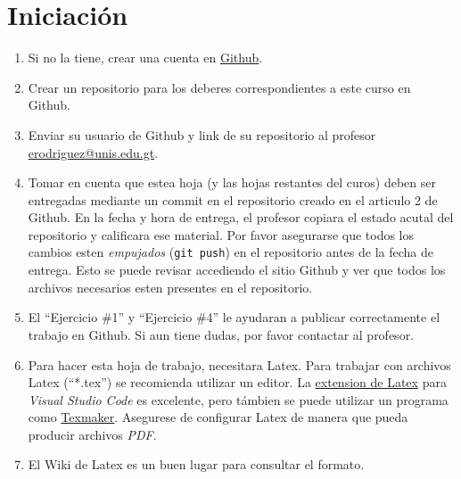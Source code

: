\documentclass{article}
\begin{document}
\section*{Iniciaci\'on}
\begin{enumerate}
        \item{Si no la tiene, crear una cuenta en \href{https://github.com/}{Github}.}
        \item{Crear un repositorio\cite{GitRepo} para los deberes correspondientes a este curso en Github.}
        \item{Enviar su usuario de Github y link de su repositorio al profesor
        \href{mailto:erodriguez@unis.edu.gt}{erodriguez@unis.edu.gt}.}
        \item{Tomar en cuenta que estea hoja
        (y las hojas restantes del curos) deben ser entregadas mediante un commit
        en el repositorio creado en el articulo 2 de Github. En la fecha y hora de entrega,
        el profesor copiara el estado acutal del repositorio y calificara ese material. Por
        favor asegurarse que todos los cambios esten \emph{empujados} (\texttt{git push}) en el
        repositorio antes de la fecha de entrega. Esto se puede revisar accediendo el sitio
        Github y ver que todos los archivos necesarios esten presentes en el repositorio.}
        \item{El ``Ejercicio \#1'' y ``Ejercicio \#4'' le ayudaran a publicar correctamente
        el trabajo en Github. Si aun tiene dudas, por favor contactar al profesor.}
        \item{Para hacer esta hoja de trabajo, necesitara Latex\cite{LatexPage}. Para trabajar
        con archivos Latex (``*.tex'') se recomienda utilizar un editor. La \href{https://marketplace.visualstudio.com/items?itemName=James-Yu.latex-workshop}{extension de
        Latex} para \emph{Visual Studio Code} es excelente, pero t\'ambien se puede utilizar
        un programa como \href{http://www.xm1math.net/texmaker/}{Texmaker}. Asegurese
        de configurar Latex de manera que pueda producir archivos \emph{PDF}.}
        \item{El Wiki de Latex\cite{Latex} es un buen lugar para consultar el formato.}
\end{enumerate}
\end{document}

